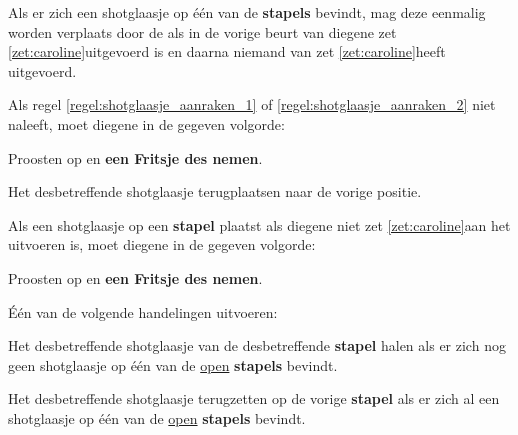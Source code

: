 \vervolgLijst{}
\item \label{regel:shotglaasje_aanraken_2} Als er zich een shotglaasje op \'e\'en van de \textbf{stapels} bevindt, mag deze eenmalig worden verplaats door de \huidigeSpeler als in de vorige beurt van diegene zet \ref{zet:caroline}\footnotemark[1] uitgevoerd is en daarna niemand van \alleSpelers zet \ref{zet:caroline}\footnotemark[3] heeft uitgevoerd.
\eindLijst{}

\vervolgLijst{}
\item Als \eenSpeler regel \ref{regel:shotglaasje_aanraken_1} of \ref{regel:shotglaasje_aanraken_2} niet naleeft, moet diegene in de gegeven volgorde:
\puntLijst{}
\item Proosten op  en \textbf{een Fritsje des nemen}\footnotemark[2].
\item Het desbetreffende shotglaasje terugplaatsen naar de vorige positie.
\eindPuntLijst{}
\eindLijst{}


\vervolgLijst{}
\item Als \eenSpeler een shotglaasje op een \textbf{stapel} plaatst als diegene niet zet \ref{zet:caroline}\footnotemark[1] aan het uitvoeren is, moet diegene in de gegeven volgorde:
\puntLijst{}
\item Proosten op  en \textbf{een Fritsje des nemen}\footnotemark[2].
\item Één van de volgende handelingen uitvoeren:
\numeriekeLijst{}
\item Het desbetreffende shotglaasje van de desbetreffende \textbf{stapel} halen als er zich nog geen shotglaasje op \'e\'en van de \ul{open} \textbf{stapels} bevindt.
\item Het desbetreffende shotglaasje terugzetten op de vorige \textbf{stapel} als er zich al een shotglaasje op \'e\'en van de \ul{open} \textbf{stapels} bevindt.
\eindNumeriekeLijst{}
\eindPuntLijst{}
\eindLijst{}

\footnotetext[2]{\footnoteFritsjeDesNemen}
